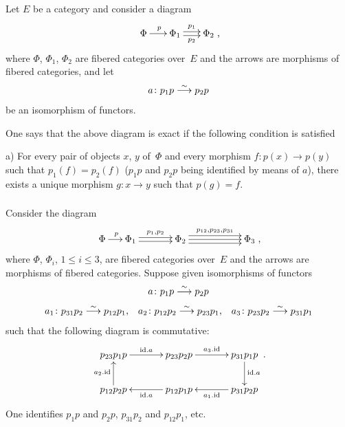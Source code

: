 \begin{definitions}
\label{XIII.1.10}
\leavevmode
\subsubsection{}
\label{XIII.1.10.1}
Let $E$ be a category and consider a diagram
$$
\xymatrix@C=.6cm{ \Phi \ar[r]^p & \Phi_1 \ar@<2pt>[r]^{p_1}
\ar@<-2pt>[r]_{p_2} & \Phi_2 } \text{,}
$$
where $\Phi$, $\Phi_1$, $\Phi_2$ are fibered categories
over~$E$ and the arrows are morphisms of fibered
categories, and let
$$
a \colon p_1 p \overset{\sim}{\longrightarrow} p_2 p
$$
be an isomorphism of functors.

One says that the above diagram is exact if the following condition
is satisfied

a) For every pair of objects $x$, $y$ of~$\Phi$ and every morphism $f
\colon p(x) \to p(y)$ such that $p_1(f) = p_2(f)$ ($p_1p$ and
$p_2p$ being identified by means of $a$), there exists a
unique morphism $g \colon x \to y$ such that $p(g)=f$.

\subsubsection{}
\label{XIII.1.10.2}
Consider the diagram
$$
\xymatrix@C=.5cm{ \Phi \ar[r]^p & \Phi_1 \ar@<2pt>[rr]^{p_1,p_2}
\ar@<-2pt>[rr] && \Phi_2 \ar@<4pt>[rrr]^{p_{12},p_{23},p_{31}} \ar[rrr]
\ar@<-4pt>[rrr] &&& \Phi_3 } \text{,}
$$
where
$\Phi$, $\Phi_i$, $1 \leqslant i \leqslant 3$, are fibered
categories over~$E$ and the arrows are morphisms of fibered
categories. Suppose given isomorphisms of
functors
$$
a \colon p_1 p \overset{\sim}{\longrightarrow} p_2 p
$$
$$
a_1 \colon p_{31} p_2 \overset{\sim}{\longrightarrow} p_{12} p_1 \text{,}\quad a_2 \colon p_{12}
p_2 \overset{\sim}{\longrightarrow} p_{23} p_1 \text{,}\quad a_3 \colon p_{23} p_2 \overset{\sim}{\longrightarrow}
p_{31}p_1
$$
such that the following diagram is commutative:
$$
\xymatrix@C=1.2cm{ p_{23} p_1 p \ar[r]^{\id.a} & p_{23} p_2 p \ar[r]^{a_3.\id}
& p_{31} p_1 p \ar[d]^{\id.a} \\ p_{12} p_2 p \ar[u]^{a_2.\id} &
p_{12} p_1 p \ar[l]^{\id.a} & p_{31} p_2 p \ar[l]^{a_1.\id} } \text{.}
$$
One identifies $p_1 p$ and $p_2 p$, $p_{31} p_2$ and $p_{12} p_1$, etc.


\end{definitions}
